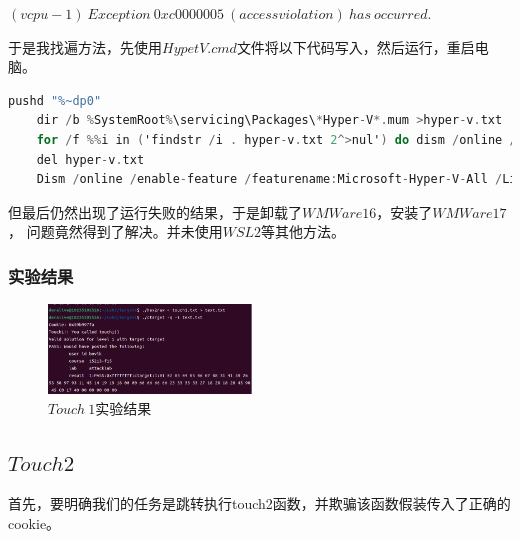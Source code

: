 $(vcpu-1) \ Exception \ 0xc0000005 \ (access violation) \ has \ occurred.$

于是我找遍方法，先使用$HypetV.cmd$文件将以下代码写入，然后运行，重启电脑。

\begin{lstlisting}[language = C , title = { $Hyper-V$.cmd } ]
    pushd "%~dp0"
    dir /b %SystemRoot%\servicing\Packages\*Hyper-V*.mum >hyper-v.txt
    for /f %%i in ('findstr /i . hyper-v.txt 2^>nul') do dism /online /norestart /add-package:"%SystemRoot%\servicing\Packages\%%i"
    del hyper-v.txt
    Dism /online /enable-feature /featurename:Microsoft-Hyper-V-All /LimitAccess /ALL
\end{lstlisting}

但最后仍然出现了运行失败的结果，于是卸载了$ WMWare 16 $，安装了$ WMWare 17$，
问题竟然得到了解决。并未使用$WSL2$等其他方法。

\subsubsection{实验结果}
\begin{figure} [H]
    \centering
    \includegraphics[width=0.48\textwidth]{Touch1.png}
    \caption{$Touch\ 1$实验结果}
\end{figure}

\subsection{$Touch 2$}
首先，要明确我们的任务是跳转执行touch2函数，并欺骗该函数假装传入了正确的cookie。

